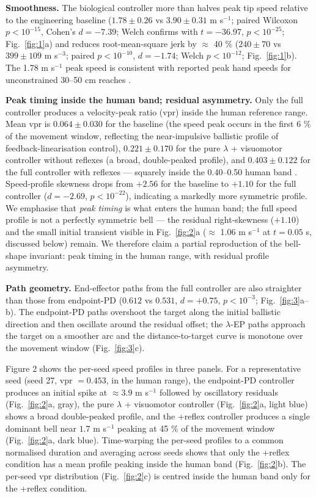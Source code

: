 \documentclass[sn-basic]{sn-jnl}
\begin{document}
\textbf{Smoothness.} The biological controller more than halves peak tip
speed relative to the engineering baseline (\(1.78 \pm 0.26\) vs
\(3.90 \pm 0.31\) m s\(^{-1}\); paired Wilcoxon \(p < 10^{-15}\),
Cohen's \(d = -7.39\); Welch confirms with \(t = -36.97\),
\(p < 10^{-25}\); Fig.~\ref{fig:1}a) and reduces root-mean-square jerk by $\approx$ 40 \%
(\(240 \pm 70\) vs \(399 \pm 109\) m s\(^{-3}\); paired
\(p < 10^{-10}\), \(d = -1.74\); Welch \(p < 10^{-12}\); Fig.~\ref{fig:1}b). The
1.78 m s\(^{-1}\) peak speed is consistent with reported peak hand
speeds for unconstrained 30--50 cm reaches \citep{morasso1981}.

\textbf{Peak timing inside the human band; residual asymmetry.} Only the
full controller produces a velocity-peak ratio (vpr) inside the human
reference range. Mean vpr is \(0.064 \pm 0.030\) for the baseline (the
speed peak occurs in the first 6 \% of the movement window, reflecting
the near-impulsive ballistic profile of feedback-linearisation control),
\(0.221 \pm 0.170\) for the pure $\lambda$ + visuomotor controller without
reflexes (a broad, double-peaked profile), and \(0.403 \pm 0.122\) for
the full controller with reflexes --- squarely inside the 0.40--0.50
human band \citep{flashhogan1985}. Speed-profile skewness drops from
\(+2.56\) for the baseline to \(+1.10\) for the full controller
(\(d = -2.69\), \(p < 10^{-22}\)), indicating a markedly more symmetric
profile. We emphasise that \emph{peak timing} is what enters the human
band; the full speed profile is not a perfectly symmetric bell --- the
residual right-skewness (\(+1.10\)) and the small initial transient
visible in Fig.~\ref{fig:2}a ($\approx$ 1.06 m s\(^{-1}\) at \(t = 0.05\) s, discussed
below) remain. We therefore claim a partial reproduction of the
bell-shape invariant: peak timing in the human range, with residual
profile asymmetry.

\textbf{Path geometry.} End-effector paths from the full controller are
also straighter than those from endpoint-PD (\(0.612\) vs \(0.531\),
\(d = +0.75\), \(p < 10^{-3}\); Fig.~\ref{fig:3}a--b). The endpoint-PD paths
overshoot the target along the initial ballistic direction and then
oscillate around the residual offset; the $\lambda$-EP paths approach the target
on a smoother arc and the distance-to-target curve is monotone over the
movement window (Fig.~\ref{fig:3}c).

Figure 2 shows the per-seed speed profiles in three panels. For a
representative seed (seed 27, vpr \(= 0.453\), in the human range), the
endpoint-PD controller produces an initial spike at \(\approx 3.9\) m
s\(^{-1}\) followed by oscillatory residuals (Fig.~\ref{fig:2}a, gray), the pure $\lambda$
+ visuomotor controller (Fig.~\ref{fig:2}a, light blue) shows a broad
double-peaked profile, and the +reflex controller produces a single
dominant bell near \(1.7\) m s\(^{-1}\) peaking at 45 \% of the movement
window (Fig.~\ref{fig:2}a, dark blue). Time-warping the per-seed profiles to a
common normalised duration and averaging across seeds shows that only
the +reflex condition has a mean profile peaking inside the human band
(Fig.~\ref{fig:2}b). The per-seed vpr distribution (Fig.~\ref{fig:2}c) is centred inside the
human band only for the +reflex condition.
\end{document}
